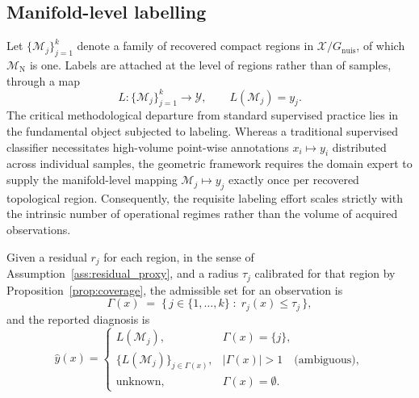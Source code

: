 \documentclass[a4paper]{cas-sc}
\newcommand{\Mnominal}{\ensuremath{\mathcal{M}_{\mathrm{N}}}}
\newcommand{\quotient}{\ensuremath{\mathcal{X}/G_{\mathrm{nuis}}}}
\newcommand{\residual}{\ensuremath{r}}
\begin{document}
\subsection{Manifold-level labelling}
\label{subsec:manifold_labelling}

Let \(\{\mathcal{M}_j\}_{j=1}^{k}\) denote a family of recovered compact
regions in \(\quotient\), of which \(\Mnominal\) is one. Labels are attached
at the level of regions rather than of samples, through a map
\begin{equation}
L:\{\mathcal{M}_j\}_{j=1}^{k}\longrightarrow \mathcal{Y},
\qquad L(\mathcal{M}_j)=y_j .
\label{eq:labelling_map}
\end{equation}
The critical methodological departure from standard supervised practice lies in the fundamental object subjected to labeling. Whereas a traditional supervised classifier necessitates high-volume point-wise annotations \(x_i\mapsto y_i\) distributed across individual samples, the geometric framework requires the domain expert to supply the manifold-level mapping \(\mathcal{M}_j\mapsto y_j\) exactly once per recovered topological region. Consequently, the requisite labeling effort scales strictly with the intrinsic number of operational regimes rather than the volume of acquired observations.

Given a residual \(\residual_j\) for each region, in the sense of
Assumption~\ref{ass:residual_proxy}, and a radius \(\tau_j\) calibrated for
that region by Proposition~\ref{prop:coverage}, the admissible set for an
observation is
\begin{equation}
\Gamma(x) \;=\; \bigl\{\, j \in \{1,\ldots,k\} \;:\; \residual_j(x)\le\tau_j \,\bigr\},
\label{eq:admissible_set}
\end{equation}
and the reported diagnosis is
\begin{equation}
\hat y(x)=
\begin{cases}
L(\mathcal{M}_j), & \Gamma(x)=\{j\},\\[2pt]
\{L(\mathcal{M}_j)\}_{j\in\Gamma(x)}, & |\Gamma(x)|>1 \quad\text{(ambiguous)},\\[2pt]
\mathrm{unknown}, & \Gamma(x)=\emptyset .
\end{cases}
\label{eq:set_valued_rule}
\end{equation}
\end{document}
